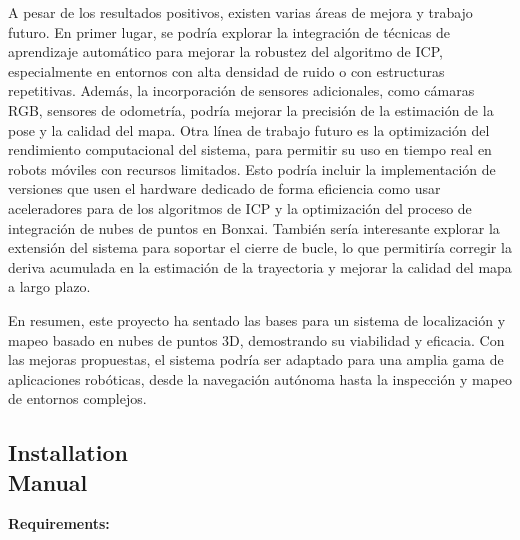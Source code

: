 \documentclass[12pt, a4paper, twoside]{article}
\begin{document}
A pesar de los resultados positivos, existen varias áreas de mejora y trabajo futuro. En primer lugar, se podría explorar la integración de técnicas de aprendizaje automático para mejorar la robustez del
algoritmo de ICP, especialmente en entornos con alta densidad de ruido o con estructuras repetitivas. Además, la incorporación de sensores adicionales, como cámaras RGB, sensores de odometría, 
podría mejorar la precisión de la estimación de la pose y la calidad del mapa.\newline
Otra línea de trabajo futuro es la optimización del rendimiento computacional del sistema, para permitir su uso en tiempo real en robots móviles con recursos limitados. Esto podría incluir la 
implementación de versiones que usen el hardware dedicado de forma eficiencia como usar aceleradores para de los algoritmos de ICP y la optimización del proceso de integración de nubes de 
puntos en Bonxai.\newline
También sería interesante explorar la extensión del sistema para soportar el cierre de bucle, lo que permitiría corregir la deriva acumulada en la estimación de la trayectoria y mejorar la calidad del mapa
a largo plazo.\newline

En resumen, este proyecto ha sentado las bases para un sistema de localización y mapeo basado en nubes de puntos 3D, demostrando su viabilidad y eficacia. Con las mejoras propuestas, el sistema podría
ser adaptado para una amplia gama de aplicaciones robóticas, desde la navegación autónoma hasta la inspección y mapeo de entornos complejos.




\newpage

\begin{umaappendices}

\section{Installation \\ Manual}
  
  \textbf{\large{Requirements:}}

\end{umaappendices}
\end{document}
